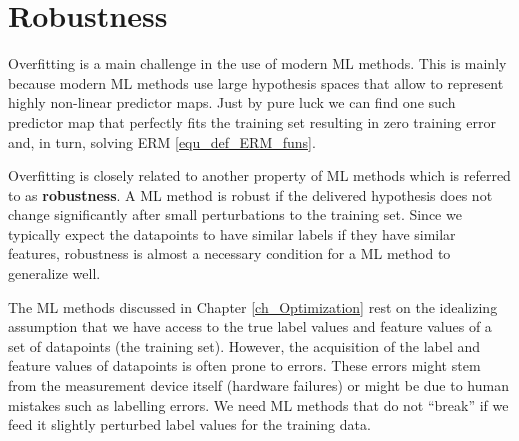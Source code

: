 \documentclass[12pt]{report}
\begin{document}


\section{Robustness} 
\label{sec_robustness} 

Overfitting is a main challenge in the use of modern ML methods. This is 
mainly because modern ML methods use large hypothesis spaces that allow to 
represent highly non-linear predictor maps. Just by pure luck 
we can find one such predictor map that perfectly fits the 
training set resulting in zero training error and, in turn, solving 
ERM \eqref{equ_def_ERM_funs}. 

Overfitting is closely related to another property of ML methods which 
is referred to as {\bf robustness}. A ML method is robust if the delivered 
hypothesis does not change significantly after small perturbations to 
the training set. Since we typically expect the datapoints to have similar 
labels if they have similar features, robustness is almost a necessary condition for 
a ML method to generalize well. 

The ML methods discussed in Chapter \ref{ch_Optimization} rest on the 
idealizing assumption that we have access to the true label values and feature 
values of a set of datapoints (the training set). However, the acquisition of 
the label and feature values of datapoints is often prone to errors. These 
errors might stem from the measurement device itself (hardware failures) 
or might be due to human mistakes such as labelling errors. We need ML 
methods that do not ``break'' if we feed it slightly perturbed label values 
for the training data. 
\end{document}
